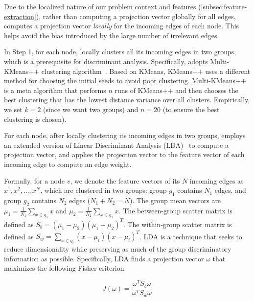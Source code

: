 Due to the localized nature of our problem context and features (\cref{subsec:feature-extraction}), rather than computing a projection vector globally for all edges, 
\tool computes a projection vector \emph{locally} for the incoming edges of each node.
This helps avoid the bias introduced by the large number of irrelevant edges.

In Step 1, for each node, \tool locally clusters all its incoming edges in two groups, which is a prerequisite for discriminant analysis. 
Specifically, \tool adopts Multi-KMeans++ clustering algorithm~\cite{Arthur:2007:KAC:1283383.1283494}.
Based on KMeans, KMeans++ uses a different method for choosing the initial seeds to avoid poor clustering.
Multi-KMeans++ is a meta algorithm that performs $n$ runs of KMeans++ and then chooses the best clustering that has the lowest distance variance over all clusters.
Empirically, we set $k=2$ (since we want two groups) and $n=20$ (to ensure the best clustering is chosen).


For each node, after locally clustering its incoming edges in two groups, \tool employs an extended version of Linear Discriminant Analysis (LDA)~\cite{Mika99fisherdiscriminant} to compute a projection vector, and applies the projection vector to the feature vector of each incoming edge to compute an edge weight. 

Formally, for a node $v$, we denote the feature vectors of its $N$ incoming edges as $x^{1}, x^{2}, \dots, x^{N}$, which are clustered in two groups: group $g_1$ contains $N_1$ edges, and group $g_2$ contains $N_2$ edges (\ie $N_1 + N_2 = N$). 
The group mean vectors are $\mu_1 = \frac{1}{N_1}\sum_{x \in g_1} x$ and $\mu_2 = \frac{1}{N_2}\sum_{x\in g_2} x$.
The between-group scatter matrix is defined as $S_b = (\mu_1 - \mu_2)(\mu_1 - \mu_2)^T$.
The within-group scatter matrix is defined as $S_w = \sum_{x\in g_i}(x-\mu_i)(x-\mu_i)^T$.
LDA is a technique 
that seeks to reduce dimensionality while preserving as much of the group discriminatory information as possible. Specifically, LDA finds a projection vector $\omega$ that maximizes the following Fisher criterion:

\begin{equation}
    \label{eq:lda-objective}
    J(\omega) = \frac{\omega^TS_b\omega}{\omega^TS_w\omega}
\end{equation}

